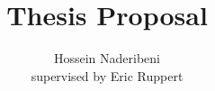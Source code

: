 \documentclass[12pt]{article}
\begin{document}
\title{Thesis Proposal}
\author{Hossein Naderibeni \\supervised by Eric Ruppert}
\maketitle

\end{document}
